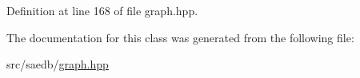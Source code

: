 Definition at line 168 of file graph.\-hpp.



The documentation for this class was generated from the following file\-:\begin{DoxyCompactItemize}
\item 
src/saedb/\hyperlink{graph_8hpp}{graph.\-hpp}\end{DoxyCompactItemize}
